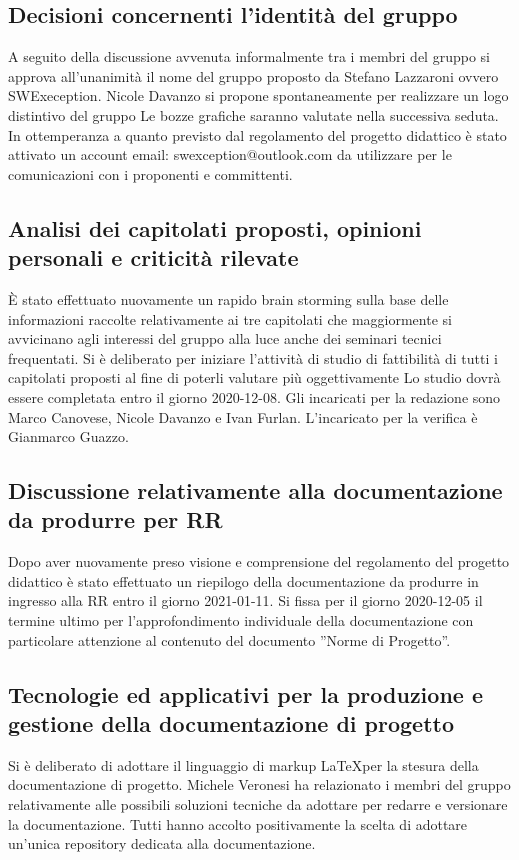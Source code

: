 \subsection{Decisioni concernenti l'identità del gruppo}
A seguito della discussione avvenuta informalmente tra i membri del gruppo si approva all'unanimità il nome del gruppo proposto da Stefano Lazzaroni ovvero SWExeception. Nicole Davanzo si propone spontaneamente per realizzare un logo distintivo del gruppo Le bozze grafiche saranno valutate nella successiva seduta.
In ottemperanza a quanto previsto dal regolamento del progetto didattico è stato attivato un account email: swexception@outlook.com da utilizzare per le comunicazioni con i proponenti e committenti.

\subsection{Analisi dei capitolati proposti, opinioni personali e criticità rilevate}
È stato effettuato nuovamente un rapido brain storming sulla base delle informazioni raccolte relativamente ai tre capitolati che maggiormente si avvicinano agli interessi del gruppo alla luce anche dei seminari tecnici frequentati.
Si è deliberato per iniziare l'attività di studio di fattibilità di tutti i capitolati proposti al fine di poterli valutare più oggettivamente Lo studio dovrà essere completata entro il giorno 2020-12-08. Gli incaricati per la redazione sono Marco Canovese, Nicole Davanzo e Ivan Furlan. L'incaricato per la verifica è Gianmarco Guazzo.

\subsection{Discussione relativamente alla documentazione da produrre per RR}
Dopo aver nuovamente preso visione e comprensione del regolamento del progetto didattico è stato effettuato un riepilogo della documentazione da produrre in ingresso alla RR entro il giorno 2021-01-11. Si fissa per il giorno 2020-12-05 il termine ultimo per l'approfondimento individuale della documentazione con particolare attenzione al contenuto del documento ”Norme di Progetto”.

\subsection{Tecnologie ed applicativi per la produzione e gestione della documentazione di progetto}

Si è deliberato di adottare il linguaggio di markup \LaTeX per la stesura della documentazione di progetto. Michele Veronesi ha relazionato i membri del gruppo relativamente alle possibili soluzioni tecniche da adottare per redarre e versionare la documentazione. Tutti hanno accolto positivamente la scelta di adottare un'unica repository dedicata alla documentazione.

